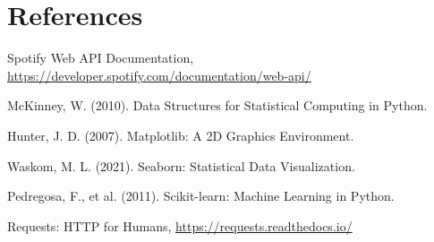 \documentclass[12pt,a4paper]{article}
\begin{document}
\section{References}

\begin{thebibliography}{9}
Spotify Web API Documentation,
\url{https://developer.spotify.com/documentation/web-api/}

McKinney, W. (2010). Data Structures for Statistical Computing in Python.

Hunter, J. D. (2007). Matplotlib: A 2D Graphics Environment.

Waskom, M. L. (2021). Seaborn: Statistical Data Visualization.

Pedregosa, F., et al. (2011). Scikit-learn: Machine Learning in Python.

Requests: HTTP for Humans,
\url{https://requests.readthedocs.io/}
\end{thebibliography}
\end{document}
